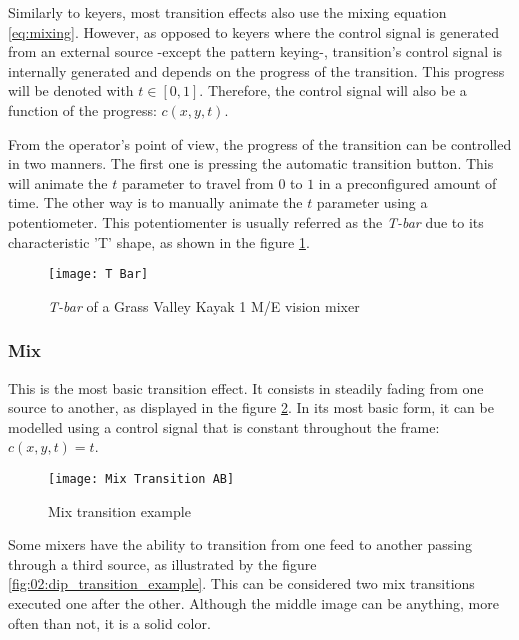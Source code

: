 \documentclass[../main.tex]{subfiles}
\begin{document}
Similarly to keyers, most transition effects also use the mixing equation \eqref{eq:mixing}. However, as opposed to keyers where the control signal is generated from an external source -except the pattern keying-, transition's control signal is internally generated and depends on the progress of the transition. This progress will be denoted with $t \in [0, 1]$. Therefore, the control signal will also be a function of the progress: $c(x, y, t)$.\newline

From the operator's point of view, the progress of the transition can be controlled in two manners. The first one is pressing the automatic transition button. This will animate the $t$ parameter to travel from $0$ to $1$ in a preconfigured amount of time. The other way is to manually animate the $t$ parameter using a potentiometer. This potentiomenter is usually referred as the \textit{T-bar} due to its characteristic 'T' shape, as shown in the figure \ref{fig:02:tbar}.\newline

\begin{figure}[htbp]
    \centering
    \texttt{[image: T Bar]}
    \caption{\textit{T-bar} of a Grass Valley Kayak 1 M/E vision mixer}
    \label{fig:02:tbar}
\end{figure}

\subsubsection{Mix}
This is the most basic transition effect. It consists in steadily fading from one source to another, as displayed in the figure \ref{fig:02:mix_transition_example}. In its most basic form, it can be modelled using a control signal that is constant throughout the frame: $c(x, y, t) = t$.\newline

\begin{figure}[htbp]
    \centering
    \texttt{[image: Mix Transition AB]}
    \caption{Mix transition example}
    \label{fig:02:mix_transition_example}
\end{figure}

Some mixers have the ability to transition from one feed to another passing through a third source, as illustrated by the figure \ref{fig:02:dip_transition_example}. This can be considered two mix transitions executed one after the other. Although the middle image can be anything, more often than not, it is a solid color\cite{atemManual}.\newline
\end{document}
